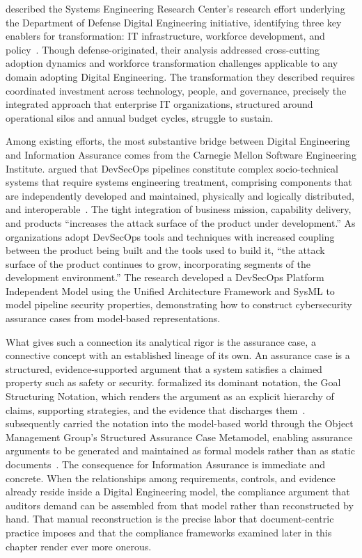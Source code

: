 \citeauthor{Bone_Blackburn_2019} described the Systems Engineering Research Center's research effort underlying the Department of Defense Digital Engineering initiative, identifying three key enablers for transformation: IT infrastructure, workforce development, and policy~\parencite{Bone_Blackburn_2019}. Though defense-originated, their analysis addressed cross-cutting adoption dynamics and workforce transformation challenges applicable to any domain adopting Digital Engineering. The transformation they described requires coordinated investment across technology, people, and governance, precisely the integrated approach that enterprise IT organizations, structured around operational silos and annual budget cycles, struggle to sustain.

Among existing efforts, the most substantive bridge between Digital Engineering and Information Assurance comes from the Carnegie Mellon Software Engineering Institute. \citeauthor{CMU_SEI_DevSecOps_2023} argued that DevSecOps pipelines constitute complex socio-technical systems that require systems engineering treatment, comprising components that are independently developed and maintained, physically and logically distributed, and interoperable~\parencite{CMU_SEI_DevSecOps_2023}. The tight integration of business mission, capability delivery, and products ``increases the attack surface of the product under development.'' As organizations adopt DevSecOps tools and techniques with increased coupling between the product being built and the tools used to build it, ``the attack surface of the product continues to grow, incorporating segments of the development environment.'' The research developed a DevSecOps Platform Independent Model using the Unified Architecture Framework and SysML to model pipeline security properties, demonstrating how to construct cybersecurity assurance cases from model-based representations.

What gives such a connection its analytical rigor is the assurance case, a connective concept with an established lineage of its own. An assurance case is a structured, evidence-supported argument that a system satisfies a claimed property such as safety or security. \citeauthor{Kelly_Weaver_2004} formalized its dominant notation, the Goal Structuring Notation, which renders the argument as an explicit hierarchy of claims, supporting strategies, and the evidence that discharges them~\parencite{Kelly_Weaver_2004}. \citeauthor{Wei_2019_SACM} subsequently carried the notation into the model-based world through the Object Management Group's Structured Assurance Case Metamodel, enabling assurance arguments to be generated and maintained as formal models rather than as static documents~\parencite{Wei_2019_SACM}. The consequence for Information Assurance is immediate and concrete. When the relationships among requirements, controls, and evidence already reside inside a Digital Engineering model, the compliance argument that auditors demand can be assembled from that model rather than reconstructed by hand. That manual reconstruction is the precise labor that document-centric practice imposes and that the compliance frameworks examined later in this chapter render ever more onerous.

